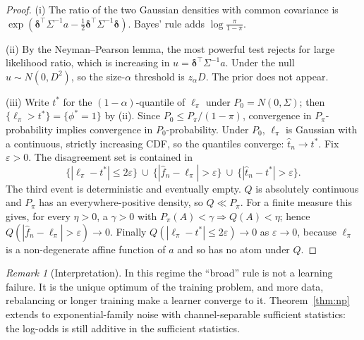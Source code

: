 \documentclass[11pt]{article}
\theoremstyle{definition}
\theoremstyle{remark}
\newtheorem{remark}[theorem]{Remark}
\newcommand{\1}{\mathbf{1}}
\begin{document}
\begin{proof}
(i) The ratio of the two Gaussian densities with common covariance is $\exp(\bm\delta^\top\Sigma^{-1}a-\frac12\bm\delta^\top\Sigma^{-1}\bm\delta)$. Bayes' rule adds $\log\frac{\pi}{1-\pi}$.

(ii) By the Neyman--Pearson lemma, the most powerful test rejects for large likelihood ratio, which is increasing in $u=\bm\delta^\top\Sigma^{-1}a$. Under the null $u\sim N(0,D^2)$, so the size-$\alpha$ threshold is $z_\alpha D$. The prior does not appear.

(iii) Write $t^*$ for the $(1-\alpha)$-quantile of $\ell_\pi$ under $P_0=N(0,\Sigma)$; then $\{\ell_\pi>t^*\}=\{\phi^*=1\}$ by (ii). Since $P_0\le P_\pi/(1-\pi)$, convergence in $P_\pi$-probability implies convergence in $P_0$-probability. Under $P_0$, $\ell_\pi$ is Gaussian with a continuous, strictly increasing CDF, so the quantiles converge: $\hat t_n\to t^*$. Fix $\varepsilon>0$. The disagreement set is contained in
\[
\{|\ell_\pi-t^*|\le2\varepsilon\}\ \cup\ \{|\hat f_n-\ell_\pi|>\varepsilon\}\ \cup\ \{|\hat t_n-t^*|>\varepsilon\}.
\]
The third event is deterministic and eventually empty. $Q$ is absolutely continuous and $P_\pi$ has an everywhere-positive density, so $Q\ll P_\pi$. For a finite measure this gives, for every $\eta>0$, a $\gamma>0$ with $P_\pi(A)<\gamma\Rightarrow Q(A)<\eta$; hence $Q(|\hat f_n-\ell_\pi|>\varepsilon)\to0$. Finally $Q(|\ell_\pi-t^*|\le2\varepsilon)\to0$ as $\varepsilon\to0$, because $\ell_\pi$ is a non-degenerate affine function of $a$ and so has no atom under $Q$.
\end{proof}

\begin{remark}[Interpretation]
In this regime the ``broad'' rule is not a learning failure. It is the unique optimum of the training problem, and more data, rebalancing or longer training make a learner converge to it. Theorem~\ref{thm:np} extends to exponential-family noise with channel-separable sufficient statistics: the log-odds is still additive in the sufficient statistics.
\end{remark}
\end{document}
